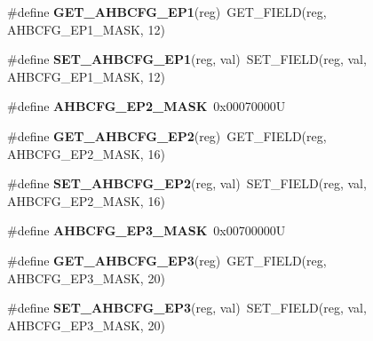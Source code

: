 \begin{DoxyCompactItemize}
\#define {\bfseries G\+E\+T\+\_\+\+A\+H\+B\+C\+F\+G\+\_\+\+E\+P1}(reg)~G\+E\+T\+\_\+\+F\+I\+E\+LD(reg, A\+H\+B\+C\+F\+G\+\_\+\+E\+P1\+\_\+\+M\+A\+SK, 12)
\item 
\mbox{\label{group__lpc24xx__regs_ga687a7ccf884088b10902b7185b7c5293}} 
\#define {\bfseries S\+E\+T\+\_\+\+A\+H\+B\+C\+F\+G\+\_\+\+E\+P1}(reg,  val)~S\+E\+T\+\_\+\+F\+I\+E\+LD(reg, val, A\+H\+B\+C\+F\+G\+\_\+\+E\+P1\+\_\+\+M\+A\+SK, 12)
\item 
\mbox{\label{group__lpc24xx__regs_ga15bb8d709949fb43ef7dcdd2911f4155}} 
\#define {\bfseries A\+H\+B\+C\+F\+G\+\_\+\+E\+P2\+\_\+\+M\+A\+SK}~0x00070000U
\item 
\mbox{\label{group__lpc24xx__regs_ga5ffea5f7ca6c1ad4e4df84a8d0bdf5e2}} 
\#define {\bfseries G\+E\+T\+\_\+\+A\+H\+B\+C\+F\+G\+\_\+\+E\+P2}(reg)~G\+E\+T\+\_\+\+F\+I\+E\+LD(reg, A\+H\+B\+C\+F\+G\+\_\+\+E\+P2\+\_\+\+M\+A\+SK, 16)
\item 
\mbox{\label{group__lpc24xx__regs_gac907e1af4211d9d8c26c3fec674f6a7a}} 
\#define {\bfseries S\+E\+T\+\_\+\+A\+H\+B\+C\+F\+G\+\_\+\+E\+P2}(reg,  val)~S\+E\+T\+\_\+\+F\+I\+E\+LD(reg, val, A\+H\+B\+C\+F\+G\+\_\+\+E\+P2\+\_\+\+M\+A\+SK, 16)
\item 
\mbox{\label{group__lpc24xx__regs_ga67fd68caff5562c1edd25755e6dec07f}} 
\#define {\bfseries A\+H\+B\+C\+F\+G\+\_\+\+E\+P3\+\_\+\+M\+A\+SK}~0x00700000U
\item 
\mbox{\label{group__lpc24xx__regs_ga051c322045104d8ffa477b3ba5571d55}} 
\#define {\bfseries G\+E\+T\+\_\+\+A\+H\+B\+C\+F\+G\+\_\+\+E\+P3}(reg)~G\+E\+T\+\_\+\+F\+I\+E\+LD(reg, A\+H\+B\+C\+F\+G\+\_\+\+E\+P3\+\_\+\+M\+A\+SK, 20)
\item 
\mbox{\label{group__lpc24xx__regs_ga550347f129185924fca4195578e29675}} 
\#define {\bfseries S\+E\+T\+\_\+\+A\+H\+B\+C\+F\+G\+\_\+\+E\+P3}(reg,  val)~S\+E\+T\+\_\+\+F\+I\+E\+LD(reg, val, A\+H\+B\+C\+F\+G\+\_\+\+E\+P3\+\_\+\+M\+A\+SK, 20)
\item 
\mbox{\label{group__lpc24xx__regs_gabc99bfc734614b12a27124765a856d64}} 

\end{DoxyCompactItemize}
